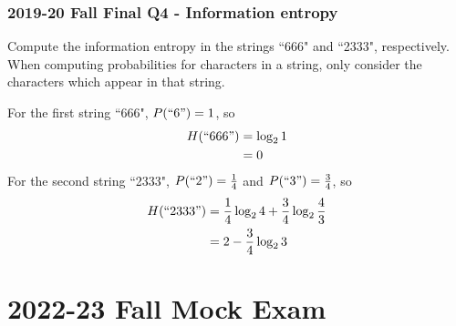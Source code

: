 \documentclass[12pt]{book} %
\numberwithin{equation}{chapter}
\begin{document}
\subsection*{2019-20 Fall Final Q4 - Information entropy}
Compute the information entropy in the strings ``666" and ``2333", respectively. When computing probabilities for characters in a string, only consider the characters which appear in that string.

\begin{solbox}
For the first string ``666", $P(``6")=1$, so
\begin{align*}
H(``666")&=\log_{2}1\\
&=0
\end{align*}
For the second string ``2333", $P(``2")=\frac{1}{4}$ and $P(``3")=\frac{3}{4}$, so
\begin{align*}
H(``2333")&=\frac{1}{4}\log_{2}4+\frac{3}{4}\log_{2}\frac{4}{3}\\
&=2-\frac{3}{4}\log_{2}3
\end{align*}
\end{solbox}

\newpage
{}
\chapter*{2022-23 Fall Mock Exam}
\end{document}
